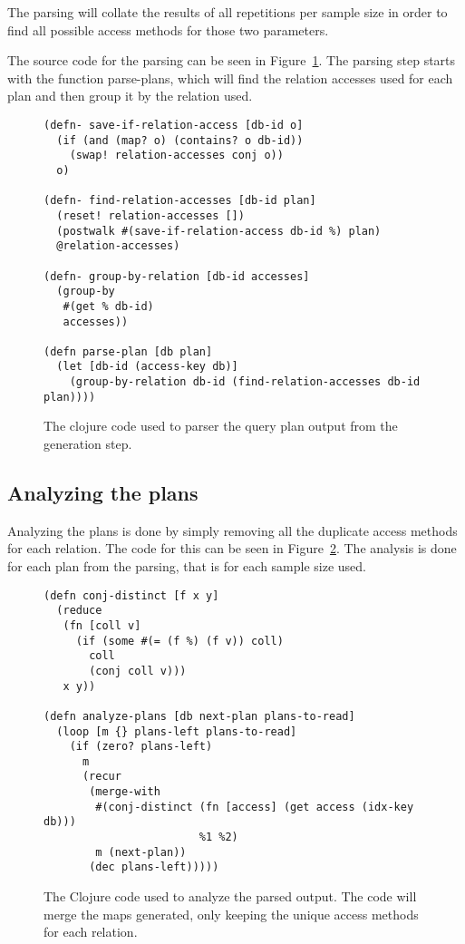 The parsing will collate the results of all repetitions per sample size
in order to find all possible access methods for those two parameters.

The source code for the parsing can be seen in Figure~\ref{fig:clj:parsing}. The
parsing step starts with the function parse-plans, which will find the relation
accesses used for each plan and then group it by the relation used.

\begin{figure}[ht]
\begin{verbatim}
(defn- save-if-relation-access [db-id o]
  (if (and (map? o) (contains? o db-id))
    (swap! relation-accesses conj o))
  o)

(defn- find-relation-accesses [db-id plan]
  (reset! relation-accesses [])
  (postwalk #(save-if-relation-access db-id %) plan)
  @relation-accesses)

(defn- group-by-relation [db-id accesses]
  (group-by
   #(get % db-id)
   accesses))

(defn parse-plan [db plan]
  (let [db-id (access-key db)]
    (group-by-relation db-id (find-relation-accesses db-id plan))))
   \end{verbatim}
   \caption[The clojure code to parse a query]{The clojure code used to parser
     the query plan output from the generation step.}
\label{fig:clj:parsing}
\end{figure}

\subsection{Analyzing the plans}\label{sec:analyzingplans}
Analyzing the plans is done by simply removing all the duplicate access methods
for each relation. The code for this can be seen in
Figure~\ref{fig:clj:analyzing}. The analysis is done for each plan from the
parsing, that is for each sample size used.

\begin{figure}[ht]
\begin{verbatim}
(defn conj-distinct [f x y]
  (reduce
   (fn [coll v]
     (if (some #(= (f %) (f v)) coll)
       coll
       (conj coll v)))
   x y))

(defn analyze-plans [db next-plan plans-to-read]
  (loop [m {} plans-left plans-to-read]
    (if (zero? plans-left)
      m
      (recur
       (merge-with
        #(conj-distinct (fn [access] (get access (idx-key db)))
                        %1 %2)
        m (next-plan))
       (dec plans-left)))))
   \end{verbatim}
   \caption[The clojure code to analyze a query]{The Clojure code used to
     analyze the parsed output. The code will merge the maps generated, only
     keeping the unique access methods for each relation.}
\label{fig:clj:analyzing}
\end{figure}


